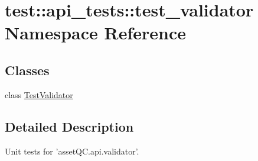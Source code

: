 \hypertarget{namespacetest_1_1api__tests_1_1test__validator}{\section{test\-:\-:api\-\_\-tests\-:\-:test\-\_\-validator \-Namespace \-Reference}
\label{d4/d89/namespacetest_1_1api__tests_1_1test__validator}
}
\subsection*{\-Classes}
\begin{DoxyCompactItemize}
\item 
class \hyperlink{classtest_1_1api__tests_1_1test__validator_1_1TestValidator}{\-Test\-Validator}
\end{DoxyCompactItemize}


\subsection{\-Detailed \-Description}
\begin{DoxyVerb}
Unit tests for 'assetQC.api.validator'.
\end{DoxyVerb}
 